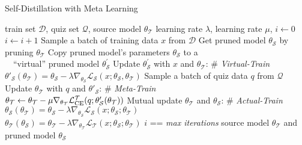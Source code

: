 \documentclass[11pt]{article}
\begin{document}
\begin{algorithm}[H]
\renewcommand{\algorithmicensure}{\textbf{Output:}}
	\caption{Self-Distillation with Meta Learning}
	\label{alg1}
	\begin{algorithmic}[1]
		\REQUIRE train set $\mathcal{D}$, quiz set $\mathcal{Q}$, source model $\theta_{\mathcal{T}}$
		\REQUIRE learning rate $\lambda$, learning rate $\mu$, $i\leftarrow 0$
		\REPEAT
\STATE $i\leftarrow i+1$
		\STATE Sample a batch of training data $x$ from $\mathcal{D}$
		\STATE Get pruned model $\theta_{\mathcal{S}}$ by pruning $\theta_{\mathcal{T}}$ 
		\STATE Copy pruned model's parameters $\theta_{\mathcal{S}}$ to a\\
		~~``virtual'' pruned model $\theta_{\mathcal{S}}^{'}$
\STATE Update $\theta_{\mathcal{S}}^{'}$ with $x$ and $\theta_{\mathcal{T}}$: \# \textit{Virtual-Train} \\ \hspace{\algorithmicindent} $\theta'_{\mathcal{S}}(\theta_{\mathcal{T}}) = \theta_{\mathcal{S}} - \lambda \nabla_{\theta_{\mathcal{S}}} \mathcal{L}_{\mathcal{S}}(x;\theta_{\mathcal{S}},\theta_{\mathcal{T}})$
		\STATE Sample a batch of quiz data $q$ from $\mathcal{Q}$
		\STATE Update $\theta_{\mathcal{T}}$ with $q$ and $\theta'_{\mathcal{S}}$: \# \textit{Meta-Train} \\ \hspace{\algorithmicindent} $\theta_{\mathcal{T}} \leftarrow \theta_{\mathcal{T}} - \mu \nabla_{\theta_{\mathcal{T}}} \mathcal{L}^{\mathcal{T}}_{\rm CE}(q;\theta'_{\mathcal{S}}(\theta_{\mathcal{T}}))$
		\STATE Mutual update $\theta_{\mathcal{T}}$ and $\theta_{\mathcal{S}}$: \# \textit{Actual-Train} \\
		    \hspace{\algorithmicindent}$\theta_{\mathcal{S}}(\theta_{\mathcal{T}}) = \theta_{\mathcal{S}} - \lambda \nabla_{\theta_{\mathcal{S}}} \mathcal{L}_{\mathcal{S}}(x;\theta_{\mathcal{S}};\theta_{\mathcal{T}})$\\
		    \hspace{\algorithmicindent} $\theta_{\mathcal{T}}(\theta_{\mathcal{S}}) = \theta_{\mathcal{T}} - \lambda \nabla_{\theta_{\mathcal{T}}} \mathcal{L}_{\mathcal{T}}(x;\theta_{\mathcal{S}};\theta_{\mathcal{T}})$
		\UNTIL $i$ == \textit{max iterations}
\ENSURE source model $\theta_{\mathcal{T}}$ and pruned model $\theta_{\mathcal{S}}$
	\end{algorithmic}  
\end{algorithm}
\end{document}
